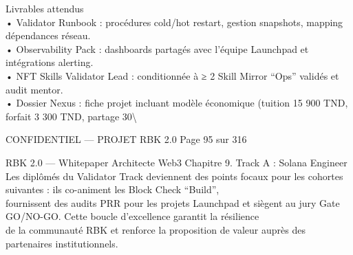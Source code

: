\documentclass[12pt,landscape,a4paper]{article}
\newenvironment{confidential}
{\begin{tcolorbox}[
    colback=rbkred!5!white,
    colframe=rbkred!75!black,
    title=CONFIDENTIEL,
    fonttitle=\bfseries\color{white},
    coltitle=rbkred!75!black,
    breakable,
    enhanced,
    frame hidden,
    borderline west={2pt}{0pt}{rbkred!75!black}
]}
{\end{tcolorbox}}
\begin{document}
\vspace{0.5em}
\vspace{0.5em}
\vspace{0.5em}
Livrables attendus\\
\vspace{0.5em}
• Validator Runbook : procédures cold/hot restart, gestion snapshots, mapping dépendances réseau.\\
\vspace{0.5em}
• Observability Pack : dashboards partagés avec l’équipe Launchpad et intégrations alerting.\\
\vspace{0.5em}
• NFT Skills Validator Lead : conditionnée à ≥ 2 Skill Mirror “Ops” validés et audit mentor.\\
\vspace{0.5em}
• Dossier Nexus : fiche projet incluant modèle économique (tuition 15 900 TND, forfait 3 300 TND, partage 30\textbackslash{}%
\vspace{0.5em}
\vspace{0.5em}
\begin{confidential}CONFIDENTIEL — PROJET RBK 2.0                                 Page 95 sur 316\end{confidential}
RBK 2.0 — Whitepaper Architecte Web3                                                                      Chapitre 9. Track A : Solana Engineer\\
\vspace{0.5em}
\vspace{0.5em}
Les diplômés du Validator Track deviennent des points focaux pour les cohortes suivantes : ils co-animent les Block Check “Build”,\\
fournissent des audits PRR pour les projets Launchpad et siègent au jury Gate GO/NO-GO. Cette boucle d’excellence garantit la résilience\\
de la communauté RBK et renforce la proposition de valeur auprès des partenaires institutionnels.\\
\vspace{0.5em}
\vspace{0.5em}
\end{document}
